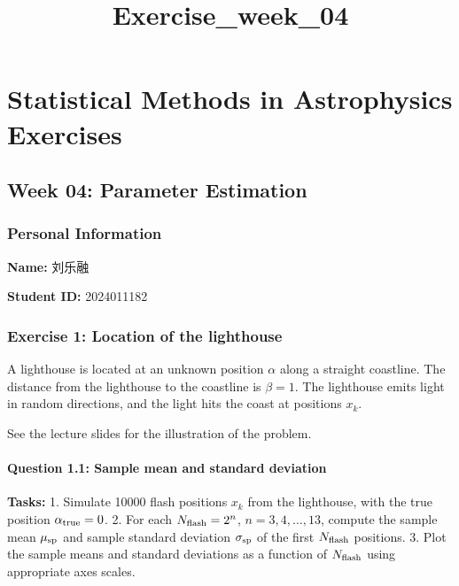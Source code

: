 \documentclass[11pt]{article}
\title{Exercise\_week\_04}
\begin{document}
    
    \maketitle
    
    

    
    \section{Statistical Methods in Astrophysics
Exercises}\label{statistical-methods-in-astrophysics-exercises}

\subsection{Week 04: Parameter
Estimation}\label{week-04-parameter-estimation}

\subsubsection{Personal Information}\label{personal-information}

\textbf{Name:} 刘乐融

\textbf{Student ID:} 2024011182

    \subsubsection{Exercise 1: Location of the
lighthouse}\label{exercise-1-location-of-the-lighthouse}

A lighthouse is located at an unknown position \(\alpha\) along a
straight coastline. The distance from the lighthouse to the coastline is
\(\beta = 1\). The lighthouse emits light in random directions, and the
light hits the coast at positions \(x_k\).

See the lecture slides for the illustration of the problem.

\paragraph{Question 1.1: Sample mean and standard
deviation}\label{question-1.1-sample-mean-and-standard-deviation}

\textbf{Tasks:} 1. Simulate 10000 flash positions \(x_k\) from the
lighthouse, with the true position \(\alpha_{\rm true} = 0\). 2. For
each \(N_{\rm flash} = 2^n\), \(n = 3, 4, \dots, 13\), compute the
sample mean \(\mu_{\rm sp}\) and sample standard deviation
\(\sigma_{\rm sp}\) of the first \(N_{\rm flash}\) positions. 3. Plot
the sample means and standard deviations as a function of
\(N_{\rm flash}\) using appropriate axes scales.
\end{document}
